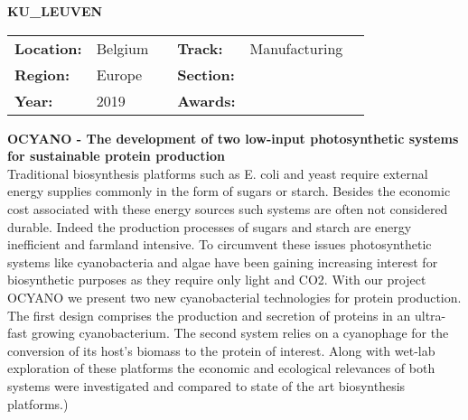 \textbf{\uppercase{KU\_LEUVEN}} \FloatBarrier \begin{table}[h] \begin{tabular}{lp{2.5cm}llll} \textbf{Location:} & Belgium & \multicolumn{1}{|l}{} & \textbf{Track:}   & Manufacturing \\ \textbf{Region:}   & Europe   & \multicolumn{1}{|l}{} & \textbf{Section:} &  \\ \textbf{Year:}     & 2019   & \multicolumn{1}{|l}{} & \textbf{Awards:}  & \end{tabular} \end{table} \FloatBarrier \noindent\textbf{OCYANO - The development of two low-input photosynthetic systems for sustainable protein production} \vspace{.2cm}\\ 
Traditional biosynthesis platforms such as E. coli and yeast require external energy supplies commonly in the form of sugars or starch. Besides the economic cost associated with these energy sources such systems are often not considered durable. Indeed the production processes of sugars and starch are energy inefficient and farmland intensive. To circumvent these issues photosynthetic systems like cyanobacteria and algae have been gaining increasing interest for biosynthetic purposes as they require only light and CO2. With our project OCYANO we present two new cyanobacterial technologies for protein production. The first design comprises the production and secretion of proteins in an ultra-fast growing cyanobacterium. The second system relies on a cyanophage for the conversion of its host’s biomass to the protein of interest. Along with wet-lab exploration of these platforms the economic and ecological relevances of both systems were investigated and compared to state of the art biosynthesis platforms.)
\vspace{2cm} $ $
\pagebreak

